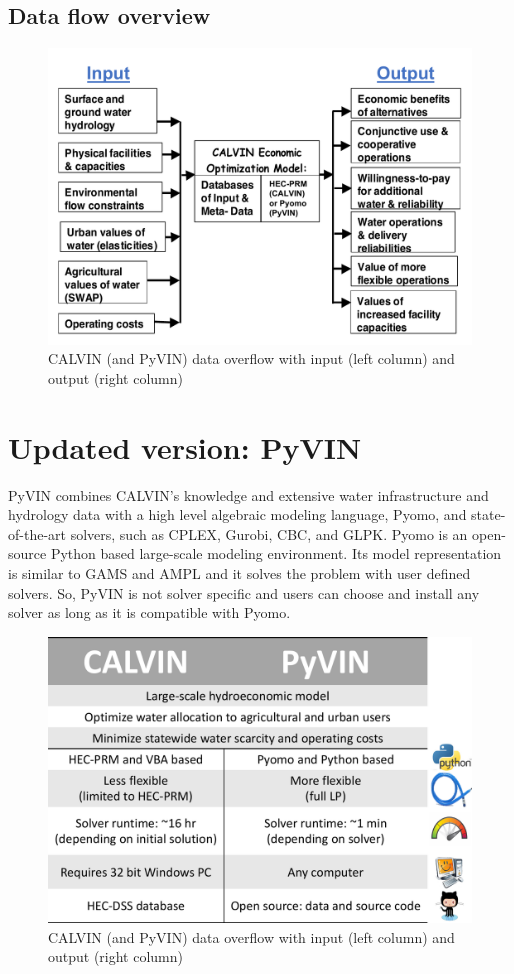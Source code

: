 \documentclass[12pt]{article}%
\begin{document}
\subsection{Data flow overview}
%
\begin{figure}[H]
    \centering
    \includegraphics[width=0.7\linewidth]{dataflow.pdf}
    \caption{CALVIN (and PyVIN) data overflow with input (left column) and output (right column)}
    \label{fig:dataflow}
\end{figure}
%
\section{Updated version: PyVIN}
%
PyVIN combines CALVIN's knowledge and extensive water infrastructure and hydrology data with a high level algebraic modeling language, Pyomo, and state-of-the-art solvers, such as CPLEX, Gurobi, CBC, and GLPK. Pyomo is an open-source Python based large-scale modeling environment. Its model representation is similar to GAMS and AMPL and it solves the problem with user defined solvers. So, PyVIN is not solver specific and users can choose and install any solver as long as it is compatible with Pyomo.
%
\begin{figure}[H]
    \centering
    \includegraphics[width=0.6\linewidth]{comparison.pdf}
    \caption{CALVIN (and PyVIN) data overflow with input (left column) and output (right column)}
    \label{fig:comparison}
\end{figure}
%
\end{document}

